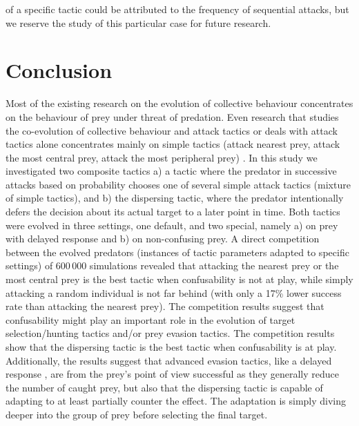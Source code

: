 of a specific tactic could be attributed to the frequency of sequential attacks, but we reserve the study of this particular case for future research.

\section{Conclusion}

Most of the existing research on the evolution of collective behaviour concentrates on the behaviour of prey under threat of predation. Even research that studies the co-evolution of collective behaviour and attack tactics or deals with attack tactics alone concentrates mainly on simple tactics (attack nearest prey, attack the most central prey, attack the most peripheral prey) \cite{demsar2014simulated,kunz2006prey,nishimura2002predator,olson2013critical,olson2013predator,olson2016evolution}. In this study we investigated two composite tactics a) a tactic where the predator in successive attacks based on probability chooses one of several simple attack tactics (mixture of simple tactics), and b) the dispersing tactic, where the predator intentionally defers the decision about its actual target to a later point in time. Both tactics were evolved in three settings, one default, and two special, namely a) on prey with delayed response and b) on non-confusing prey. A direct competition between the evolved predators (instances of tactic parameters adapted to specific settings) of 600\,000 simulations revealed that attacking the nearest prey or the most central prey is the best tactic when confusability is not at play, while simply attacking a random individual is not far behind (with only a 17\% lower success rate than attacking the nearest prey). The competition results suggest that confusability might play an important role in the evolution of target selection/hunting tactics and/or prey evasion tactics. The competition results show that the dispersing tactic is the best tactic when confusability is at play. Additionally, the results suggest that advanced evasion tactics, like a delayed response \cite{partridge1982structure}, are from the prey's point of view successful as they generally reduce the number of caught prey, but also that the dispersing tactic is capable of adapting to at least partially counter the effect. The adaptation is simply diving deeper into the group of prey before selecting the final target.


